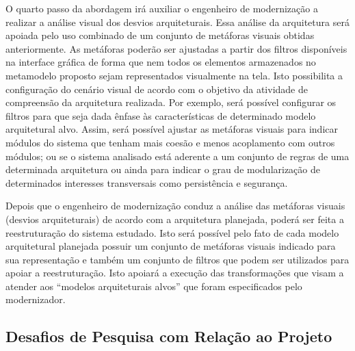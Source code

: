 \documentclass[12pt]{article}
\begin{document}
O quarto passo da abordagem irá auxiliar o engenheiro de modernização a realizar a análise visual dos desvios arquiteturais. Essa análise da arquitetura será apoiada pelo uso combinado de um conjunto de metáforas visuais obtidas anteriormente. As metáforas poderão ser ajustadas a partir dos filtros disponíveis na interface gráfica de forma que nem todos os elementos armazenados no metamodelo proposto sejam representados visualmente na tela. Isto possibilita a configuração do cenário visual de acordo com o objetivo da atividade de compreensão da arquitetura realizada. Por exemplo, será possível configurar os filtros para que seja dada ênfase às características de determinado modelo arquitetural alvo. Assim, será possível ajustar as metáforas visuais para indicar módulos do sistema que tenham mais coesão e menos acoplamento com outros módulos; ou se o sistema analisado está aderente a um conjunto de regras de uma determinada arquitetura ou ainda para indicar o grau de modularização de determinados interesses transversais como persistência e segurança.

Depois que o engenheiro de modernização conduz a análise das metáforas visuais (desvios arquiteturais) de acordo com a arquitetura planejada, poderá ser feita a reestruturação do sistema estudado. Isto será possível pelo fato de cada modelo arquitetural planejada possuir um conjunto de metáforas visuais indicado para sua representação e também um conjunto de filtros que podem ser utilizados para apoiar a reestruturação. Isto apoiará a execução das transformações que visam a atender aos ``modelos arquiteturais alvos'' que foram especificados pelo modernizador. %


\subsection{Desafios de Pesquisa com Relação ao Projeto}
\end{document}
